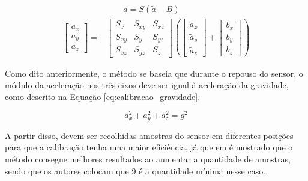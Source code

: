 \documentclass[acronym, symbols, table]{fei}
\begin{document}
			\begin{equation}\label{eq:equacao_geral_accel}
				\begin{split}
					&\quad \quad a = S(\tilde{a} - B) \\
					\begin{bmatrix}
						a_x \\ a_y \\ a_z
					\end{bmatrix} = 
					&\begin{bmatrix}
						S_x & S_{xy} & S_{xz} \\ S_{xy} & S_y & S_{yz} \\ S_{xz} & S_{yz} & S_z
					\end{bmatrix} \left(
					\begin{bmatrix}
						\tilde{a}_x \\ \tilde{a}_y \\ \tilde{a}_z
					\end{bmatrix} + 
					\begin{bmatrix}
						b_x \\ b_y \\ b_z
					\end{bmatrix}\right)
				\end{split}
			\end{equation}
			
			Como dito anteriormente, o método se baseia que durante o repouso do sensor, o módulo da aceleração nos três eixos deve ser igual à aceleração da gravidade, como descrito na Equação \ref{eq:calibracao_gravidade}.
			
			\begin{equation} \label{eq:calibracao_gravidade}
				a_{x}^{2} + a_{y}^{2} + a_{z}^{2} = g^{2}
			\end{equation}
			
			A partir disso, devem ser recolhidas amostras do sensor em diferentes posições para que a calibração tenha uma maior eficiência, já que em \textcite{menezes2020triaxial} é mostrado que o método consegue melhores resultados ao aumentar a quantidade de amostras, sendo que os autores colocam que 9 é a quantidade mínima nesse caso.
			
\end{document}
